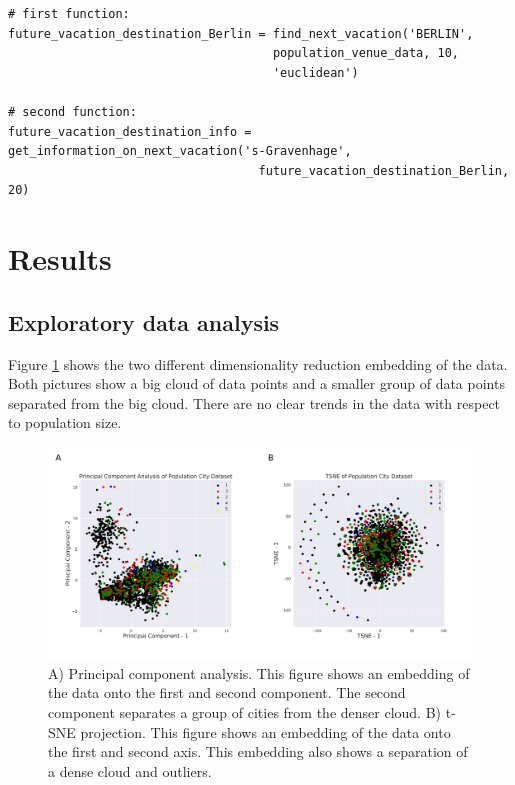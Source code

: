 \documentclass[11pt,a4paper,final]{article}
\begin{document}
\begin{verbatim}
# first function:
future_vacation_destination_Berlin = find_next_vacation('BERLIN', 
                                     population_venue_data, 10, 
                                     'euclidean')

# second function:
future_vacation_destination_info = get_information_on_next_vacation('s-Gravenhage',
                                   future_vacation_destination_Berlin, 20)
\end{verbatim}


\section{Results}
\subsection{Exploratory data analysis}
Figure \ref{fig:pca_tsne} shows the two different dimensionality reduction embedding of the data. Both pictures show a big cloud of data points and a smaller group of data points separated from the big cloud. There are no clear trends in the data with respect to population size. 

\begin{figure}[h!]
\begin{center}
\includegraphics[width = 1\textwidth]{figures/fig1.pdf} 
\caption{A) Principal component analysis. This figure shows an embedding of the data onto the first and second component. The second component separates a group of cities from the denser cloud. B) t-SNE projection. This figure shows an embedding of the data onto the first and second axis. This embedding also shows a separation of a dense cloud and outliers.}\label{fig:pca_tsne}
\end{center}
\end{figure}
\end{document}
